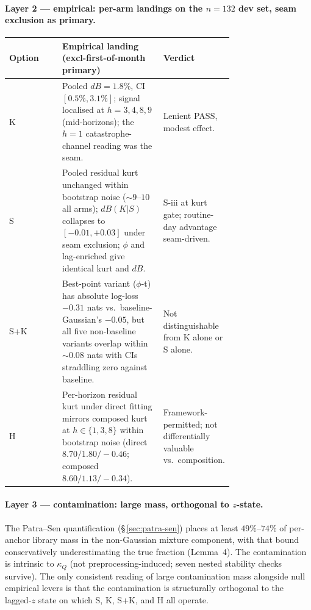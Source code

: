 \documentclass[11pt]{article}
\begin{document}
\paragraph{Layer 2 --- empirical: per-arm landings on the
\(n = 132\) dev set, seam exclusion as primary.}
\begin{center}\small
\begin{tabular}{l P{0.45\linewidth} P{0.28\linewidth}}
\toprule
Option & Empirical landing (excl-first-of-month primary) & Verdict \\
\midrule
\textsf{K}
& Pooled \(dB = 1.8\%\), CI \([0.5\%, 3.1\%]\); signal localised at
\(h = 3, 4, 8, 9\) (mid-horizons); the \(h = 1\) catastrophe-
channel reading was the seam.
& Lenient PASS, modest effect. \\
\midrule
\textsf{S}
& Pooled residual kurt unchanged within bootstrap noise
(\(\sim 9\)--\(10\) all arms); \(dB(K | S)\) collapses to
\([-0.01, +0.03]\) under seam exclusion; \(\phi\) and lag-enriched
give identical kurt and \(dB\).
& S-iii at kurt gate; routine-day advantage seam-driven. \\
\midrule
\textsf{S+K}
& Best-point variant (\(\phi\)-t) has absolute log-loss \(-0.31\)
nats vs.\ baseline-Gaussian's \(-0.05\), but all five non-baseline
variants overlap within \(\sim 0.08\) nats with CIs straddling
zero against baseline.
& Not distinguishable from \textsf{K} alone or \textsf{S} alone. \\
\midrule
\textsf{H}
& Per-horizon residual kurt under direct fitting mirrors composed
kurt at \(h \in \{1, 3, 8\}\) within bootstrap noise (direct
\(8.70 / 1.80 / -0.46\); composed \(8.60 / 1.13 / -0.34\)).
& Framework-permitted; not differentially valuable vs.\
composition. \\
\bottomrule
\end{tabular}
\end{center}

\paragraph{Layer 3 --- contamination: large mass, orthogonal to
\(z\)-state.} The Patra--Sen quantification
(\S\,\ref{sec:patra-sen}) places at least \(49\%\)--\(74\%\) of
per-anchor library mass in the non-Gaussian mixture component, with
that bound conservatively underestimating the true fraction
(Lemma~4). The contamination is intrinsic to \(\kappa_Q\) (not
preprocessing-induced; seven nested stability checks survive). The
only consistent reading of large contamination mass alongside
null empirical levers is that the contamination is structurally
orthogonal to the lagged-\(z\) state on which \textsf{S}, \textsf{K},
\textsf{S+K}, and \textsf{H} all operate.
\end{document}
